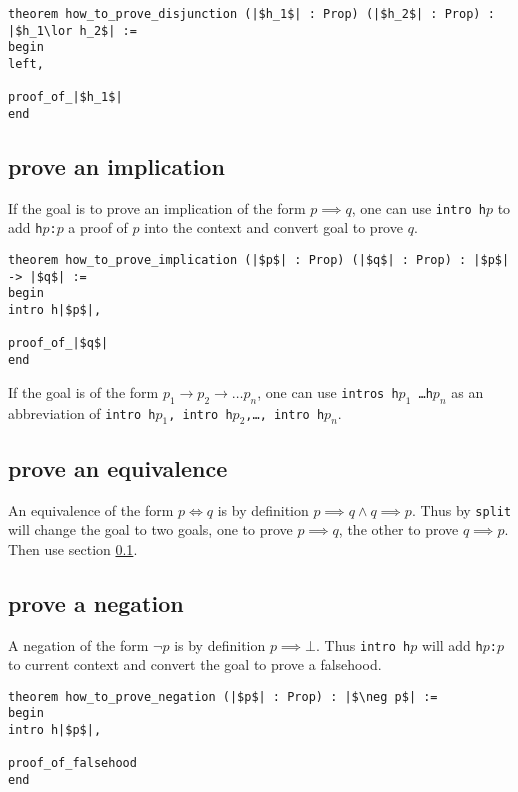 \documentclass{report}
\theoremstyle{definition}
\theoremstyle{plain}
\begin{document}
\begin{verbatim}
theorem how_to_prove_disjunction (|$h_1$| : Prop) (|$h_2$| : Prop) : |$h_1\lor h_2$| :=
begin
left,
  
proof_of_|$h_1$|
end
\end{verbatim}


\subsection{prove an implication}\label{lean:imp}
If the goal is to prove an implication of the form $p \implies q$, one can use {\tt intro h$p$} to add {\tt h$p$:$p$} a proof of $p$ into the context and convert goal to prove $q$.

\begin{verbatim}
theorem how_to_prove_implication (|$p$| : Prop) (|$q$| : Prop) : |$p$| -> |$q$| :=
begin
intro h|$p$|,
  
proof_of_|$q$|
end
\end{verbatim}

If the goal is of the form $p_1\to p_2\to\dots p_n$, one can use {\tt intros h$p_1$ \dots h$p_n$} as an abbreviation of {\tt intro h$p_1$, intro h$p_2$,\dots, intro h$p_n$}.


\subsection{prove an equivalence}\label{lean:eqv}
An equivalence of the form $p \iff q$ is by definition $p\implies q \land q\implies p$. Thus by {\tt split} will change the goal to two goals, one to prove $p\implies q$, the other to prove $q \implies p$. Then use section \ref{lean:imp}.

\subsection{prove a negation}
A negation of the form $\neg p$ is by definition $p \implies \bot$. Thus {\tt intro h$p$} will add {\tt h$p$:$p$} to current context and convert the goal to prove a falsehood.

\begin{verbatim}
theorem how_to_prove_negation (|$p$| : Prop) : |$\neg p$| :=
begin
intro h|$p$|,

proof_of_falsehood
end
\end{verbatim}
\end{document}
